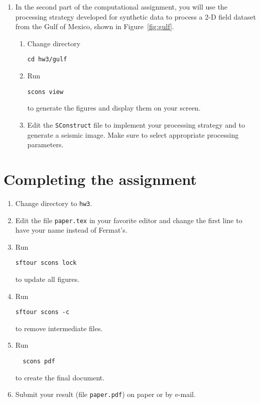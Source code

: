 \begin{enumerate}

\newpage

\item In the second part of the computational assignment, you will use the processing strategy developed for synthetic data 
to process a 2-D field dataset from the Gulf of Mexico, shown in Figure~\ref{fig:gulf}.

\begin{enumerate}
\item Change directory 
\begin{verbatim}
cd hw3/gulf
\end{verbatim}
\item Run
\begin{verbatim}
scons view
\end{verbatim}
to generate the figures and display them on your screen.
\item Edit the \texttt{SConstruct} file to implement your processing strategy and to generate a seismic image. 
Make sure to select appropriate processing parameters.
\end{enumerate}

\lstset{language=python,numbers=left,numberstyle=\tiny,showstringspaces=false}


\end{enumerate}

\newpage

\section{Completing the assignment}

\begin{enumerate}
\item Change directory to \verb#hw3#.
\item Edit the file \texttt{paper.tex} in your favorite editor 
      and change the first line to have your name instead of Fermat's.
\item Run
\begin{verbatim}
sftour scons lock
\end{verbatim}
to update all figures.
\item Run
\begin{verbatim}
sftour scons -c
\end{verbatim}
to remove intermediate files.
\item Run
\begin{verbatim} 
  scons pdf
\end{verbatim}
  to create the final document.
\item Submit your result (file \texttt{paper.pdf}) on paper or by
  e-mail. 
\end{enumerate}
